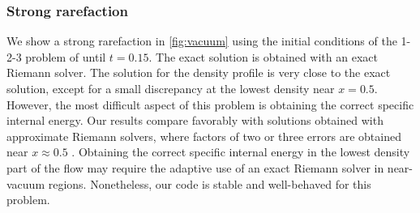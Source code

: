 \documentclass[fleqn,usenatbib]{mnras}
\begin{document}
\subsubsection{Strong rarefaction}
We show a strong rarefaction in \autoref{fig:vacuum} using the initial conditions of the 1-2-3 problem of \cite{Einfeldt_1991} until $t = 0.15$. The exact solution is obtained with an exact Riemann solver. The solution for the density profile is very close to the exact solution, except for a small discrepancy at the lowest density near $x = 0.5$. However, the most difficult aspect of this problem is obtaining the correct specific internal energy. Our results compare favorably with solutions obtained with approximate Riemann solvers, where factors of two or three errors are obtained near $x \approx 0.5$ \citep{Toro_2013}. Obtaining the correct specific internal energy in the lowest density part of the flow may require the adaptive use of an exact Riemann solver in near-vacuum regions. Nonetheless, our code is stable and well-behaved for this problem.
\end{document}
